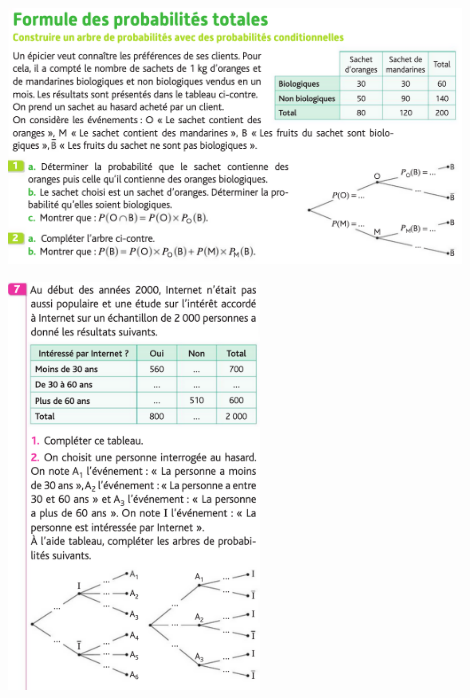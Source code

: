 \documentclass{exos}
\begin{document}
\begin{center}
\includegraphics[width=0.9\textwidth]{Exercice_Probabilite_2.png}

\vspace*{2cm}
\includegraphics[width=0.5\textwidth]{Exercice_Probabilite_1.png}
\end{center}
\end{document}
